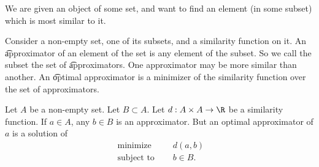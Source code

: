 

We are given an object of some set, and want to find an element (in some subset) which is most similar to it.


Consider a non-empty set, one of its subsets, and a similarity function on it.
An \t{approximator} of an element of the set is any element of the subset.
So we call the subset the set of \t{approximators}.
One approximator may be more similar than another.
An \t{optimal} approximator is a minimizer of the similarity function over the set of approximators.


Let $A$ be a non-empty set.
Let $B \subset A$.
Let $d: A \times A \to \R$ be a similarity function.
If $a \in A$, any $b \in B$ is an approximator.
But an optimal approximator of $a$ is a solution of
$$
\begin{aligned}
  \text{ minimize }   & \quad d(a, b) \\
  \text{ subject to } & \quad b \in B.
\end{aligned}
$$
